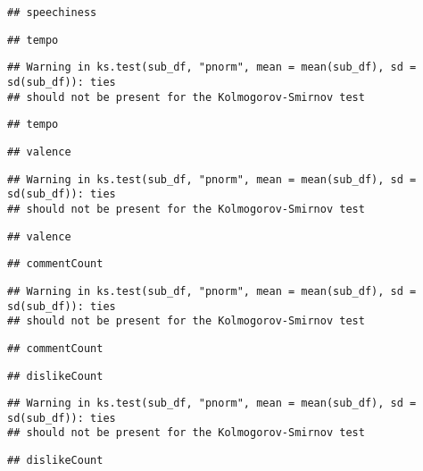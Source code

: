 \documentclass[
]{article}
\begin{document}
\begin{verbatim}
## speechiness
\end{verbatim}

\begin{verbatim}
## tempo
\end{verbatim}

\begin{verbatim}
## Warning in ks.test(sub_df, "pnorm", mean = mean(sub_df), sd = sd(sub_df)): ties
## should not be present for the Kolmogorov-Smirnov test
\end{verbatim}

\begin{verbatim}
## tempo
\end{verbatim}

\begin{verbatim}
## valence
\end{verbatim}

\begin{verbatim}
## Warning in ks.test(sub_df, "pnorm", mean = mean(sub_df), sd = sd(sub_df)): ties
## should not be present for the Kolmogorov-Smirnov test
\end{verbatim}

\begin{verbatim}
## valence
\end{verbatim}

\begin{verbatim}
## commentCount
\end{verbatim}

\begin{verbatim}
## Warning in ks.test(sub_df, "pnorm", mean = mean(sub_df), sd = sd(sub_df)): ties
## should not be present for the Kolmogorov-Smirnov test
\end{verbatim}

\begin{verbatim}
## commentCount
\end{verbatim}

\begin{verbatim}
## dislikeCount
\end{verbatim}

\begin{verbatim}
## Warning in ks.test(sub_df, "pnorm", mean = mean(sub_df), sd = sd(sub_df)): ties
## should not be present for the Kolmogorov-Smirnov test
\end{verbatim}

\begin{verbatim}
## dislikeCount
\end{verbatim}
\end{document}
